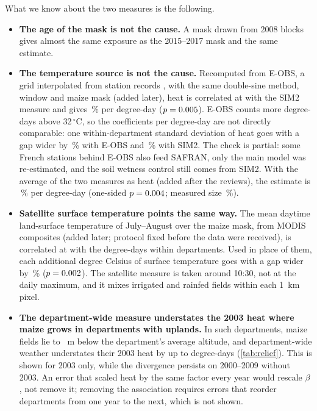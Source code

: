 What we know about the two measures is the following.
\begin{itemize}
  \item \textbf{The age of the mask is not the cause.} A mask drawn from 2008 blocks gives almost the same exposure as the 2015--2017 mask and the same estimate.
  \item \textbf{The temperature source is not the cause.} Recomputed from E-OBS, a grid interpolated from station records \parencite{cornes2018}, with the same double-sine method, window and maize mask (added later), heat is correlated at \EobsCorr{} with the SIM2 measure and gives \EobsPct\,\% per degree-day ($p = 0.005$). E-OBS counts more degree-days above 32\,$^{\circ}$C, so the coefficients per degree-day are not directly comparable: one within-department standard deviation of heat goes with a gap wider by \EobsSdEffect\,\% with E-OBS and \SimSdEffect\,\% with SIM2. The check is partial: some French stations behind E-OBS also feed SAFRAN, only the main model was re-estimated, and the soil wetness control still comes from SIM2. With the average of the two measures as heat (added after the reviews), the estimate is \AvgHeatPct\,\% per degree-day (one-sided $p = 0.004$; measured size \AvgHeatSize\,\%).
  \item \textbf{Satellite surface temperature points the same way.} The mean daytime land-surface temperature of July--August over the maize mask, from MODIS composites \parencite{wan2021} (added later; protocol fixed before the data were received), is correlated at \LstCorr{} with the degree-days within departments. Used in place of them, each additional degree Celsius of surface temperature goes with a gap wider by \LstPct\,\% ($p = 0.002$). The satellite measure is taken around 10:30, not at the daily maximum, and it mixes irrigated and rainfed fields within each 1~km pixel.
  \item \textbf{The department-wide measure understates the 2003 heat where maize grows in departments with uplands.} In \ReliefCount{} such departments, maize fields lie \ReliefAltDiffMin{} to \ReliefAltDiffMax{}~m below the department's average altitude, and department-wide weather understates their 2003 heat by up to \ReliefGapMax{} degree-days (\cref{tab:relief}). This is shown for 2003 only, while the divergence persists on 2000--2009 without 2003. An error that scaled heat by the same factor every year would rescale $\beta$, not remove it; removing the association requires errors that reorder departments from one year to the next, which is not shown.

\end{itemize}
